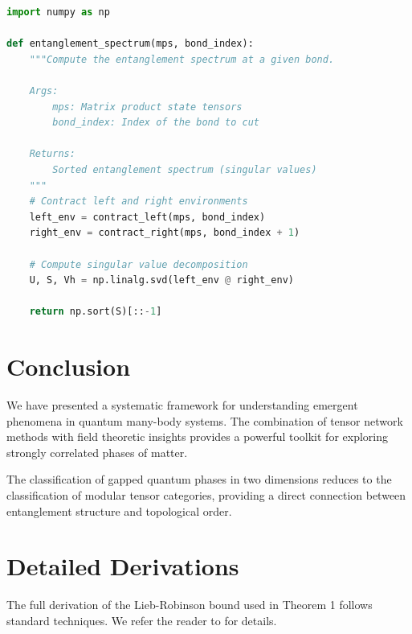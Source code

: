 \documentclass[papermode]{academic-report}
\begin{document}
\begin{lstlisting}[language=Python, caption={Computing entanglement spectrum from MPS}]
import numpy as np

def entanglement_spectrum(mps, bond_index):
    """Compute the entanglement spectrum at a given bond.

    Args:
        mps: Matrix product state tensors
        bond_index: Index of the bond to cut

    Returns:
        Sorted entanglement spectrum (singular values)
    """
    # Contract left and right environments
    left_env = contract_left(mps, bond_index)
    right_env = contract_right(mps, bond_index + 1)

    # Compute singular value decomposition
    U, S, Vh = np.linalg.svd(left_env @ right_env)

    return np.sort(S)[::-1]
\end{lstlisting}

\section{Conclusion}

We have presented a systematic framework for understanding emergent phenomena
in quantum many-body systems. The combination of tensor network methods with
field theoretic insights provides a powerful toolkit for exploring strongly
correlated phases of matter.

\begin{corollaryblock}[Classification]
The classification of gapped quantum phases in two dimensions reduces to the
classification of modular tensor categories, providing a direct connection
between entanglement structure and topological order.
\end{corollaryblock}

\appendix
\section{Detailed Derivations}

The full derivation of the Lieb-Robinson bound used in Theorem 1 follows
standard techniques. We refer the reader to \cite{bravyi2006} for details.

\printbibliography[title={References}]
\end{document}
